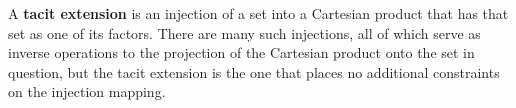 \documentclass[12pt]{article}
\begin{document}

A \textbf{tacit extension} is an injection of a set into a Cartesian product that has that set as one of its factors.  There are many such injections, all of which serve as inverse operations to the projection of the Cartesian product onto the set in question, but the tacit extension is the one that places no additional constraints on the injection mapping.

\end{document}
